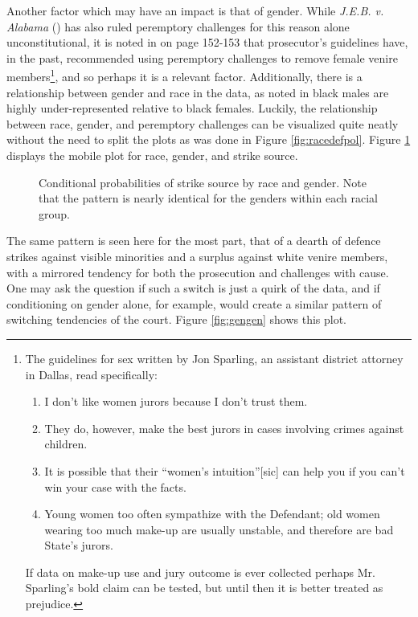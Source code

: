Another factor which may have an impact is that of gender. While \textit{J.E.B. v. Alabama} (\cite{jebvalabama}) has also ruled
peremptory challenges for this reason alone unconstitutional, it is noted in \cite{vandykejurysel} on page 152-153 that
prosecutor's guidelines have, in the past, recommended using peremptory challenges to remove female venire members\footnote{The
  guidelines for sex written by Jon Sparling, an assistant district attorney in Dallas, read specifically: \begin{enumerate}
  \item I don't like women jurors because I don't trust them.
  \item They do, however, make the best jurors in cases involving crimes against children.
  \item It is possible that their ``women's intuition''[sic] can help you if you can't win your case with the facts.
  \item Young women too often sympathize with the Defendant; old women wearing too much make-up are usually unstable, and
    therefore are bad State's jurors.
  \end{enumerate}
  If data on make-up use and jury outcome is ever collected perhaps Mr. Sparling's bold claim can be tested, but until then it is
  better treated as prejudice.}, and so perhaps it is a relevant factor. Additionally, there is a relationship between gender and
race in the data, as noted in \cite{JurySunshineProj} black males are highly under-represented relative to black females. Luckily,
the relationship between race, gender, and peremptory challenges can be visualized quite neatly without the need to split the
plots as was done in Figure \ref{fig:racedefpol}. Figure \ref{fig:racegenpol} displays the mobile plot for race, gender, and
strike source.

\begin{figure}[h!]
  \centering
  \caption[Strike Source by Race and Gender (Sunshine)]
  {Conditional probabilities of strike source by race and gender. Note that the pattern is nearly identical for the genders within
    each racial group.} \label{fig:racegenpol}
\end{figure}

The same pattern is seen here for the most part, that of a dearth of defence strikes against visible minorities and a surplus
against white venire members, with a mirrored tendency for both the prosecution and challenges with cause. One may ask the
question if such a switch is just a quirk of the data, and if conditioning on gender alone, for example, would create a similar
pattern of switching tendencies of the court. Figure \ref{fig:gengen} shows this plot.

